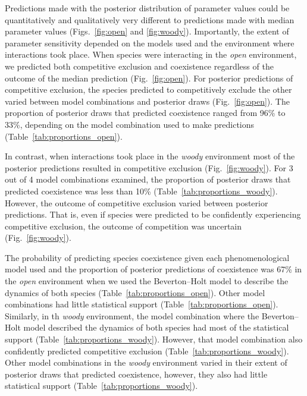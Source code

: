 \begin{refsection}
Predictions made with the posterior distribution of parameter values could be quantitatively and qualitatively very different to predictions made with median parameter values (Figs.~\ref{fig:open} and \ref{fig:woody}). Importantly, the extent of parameter sensitivity depended on the models used and the environment where interactions took place. When species were interacting in the \textit{open} environment, we predicted both competitive exclusion and coexistence regardless of the outcome of the median prediction (Fig.~\ref{fig:open}). For posterior predictions of competitive exclusion, the species predicted to competitively exclude the other varied between model combinations and posterior draws (Fig.~\ref{fig:open}). The proportion of posterior draws that predicted coexistence ranged from 96\% to 33\%, depending on the model combination used to make predictions (Table~\ref{tab:proportions_open}).


In contrast, when interactions took place in the \textit{woody} environment  most of the posterior predictions resulted in competitive exclusion (Fig.~\ref{fig:woody}). For 3 out of 4 model combinations examined, the proportion of posterior draws that predicted coexistence was less than 10\% (Table~\ref{tab:proportions_woody}). However, the outcome of competitive exclusion varied  between  posterior predictions. That is, even if species were predicted to be confidently experiencing competitive exclusion, the outcome of competition was uncertain (Fig.~\ref{fig:woody}).


The probability of predicting species coexistence given each phenomenological model used and the proportion of posterior predictions of coexistence was 67\% in the \textit{open} environment when we used the Beverton--Holt model to describe the dynamics of both species (Table~\ref{tab:proportions_open}). Other model combinations had little statistical support  (Table~\ref{tab:proportions_open}). Similarly, in th \textit{woody} environment, the model combination where the Beverton--Holt model described the dynamics of both species had most of the statistical support (Table~\ref{tab:proportions_woody}). However, that model combination also confidently predicted competitive exclusion (Table~\ref{tab:proportions_woody}). Other model combinations in the \textit{woody} environment varied in their extent of posterior draws that predicted coexistence, however, they also had little statistical support (Table~\ref{tab:proportions_woody}).



\end{refsection}

